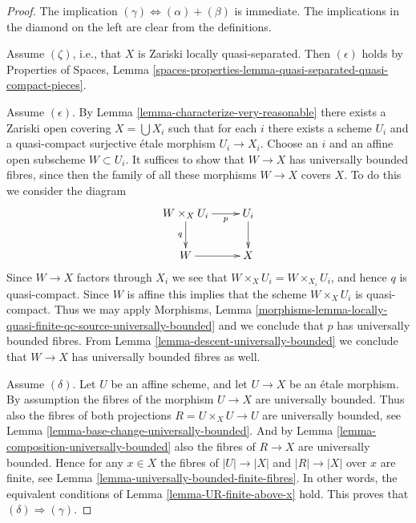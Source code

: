 \documentclass{stacks-project}
\theoremstyle{plain}
\theoremstyle{definition}
\theoremstyle{remark}
\numberwithin{equation}{subsection}
\begin{document}
\begin{proof}
The implication $(\gamma) \Leftrightarrow (\alpha) + (\beta)$ is immediate.
The implications in the diamond on the left are clear from the
definitions.

\medskip\noindent
Assume $(\zeta)$, i.e., that $X$ is Zariski locally quasi-separated.
Then $(\epsilon)$ holds by
Properties of Spaces, Lemma
\ref{spaces-properties-lemma-quasi-separated-quasi-compact-pieces}.

\medskip\noindent
Assume $(\epsilon)$. By
Lemma \ref{lemma-characterize-very-reasonable}
there exists
a Zariski open covering $X = \bigcup X_i$ such that for each $i$
there exists a scheme $U_i$ and a quasi-compact surjective \'etale morphism
$U_i \to X_i$. Choose an $i$ and an affine open subscheme $W \subset U_i$.
It suffices to show that $W \to X$ has universally bounded fibres, since then
the family of all these morphisms $W \to X$ covers $X$.
To do this we consider the diagram
$$
\xymatrix{
W \times_X U_i \ar[r]_-p \ar[d]_q & U_i \ar[d] \\
W \ar[r] & X
}
$$
Since $W \to X$ factors through $X_i$ we see that
$W \times_X U_i = W \times_{X_i} U_i$, and hence $q$ is quasi-compact.
Since $W$ is affine this implies that the scheme $W \times_X U_i$
is quasi-compact. Thus we may apply
Morphisms, Lemma
\ref{morphisms-lemma-locally-quasi-finite-qc-source-universally-bounded}
and we conclude that $p$ has universally bounded fibres. From
Lemma \ref{lemma-descent-universally-bounded}
we conclude that $W \to X$ has universally bounded fibres as well.

\medskip\noindent
Assume $(\delta)$. Let $U$ be an affine scheme, and let $U \to X$ be an \'etale
morphism. By assumption the fibres of the morphism $U \to X$ are universally
bounded. Thus also the fibres of both projections $R = U \times_X U \to U$
are universally bounded, see
Lemma \ref{lemma-base-change-universally-bounded}.
And by
Lemma \ref{lemma-composition-universally-bounded}
also the fibres of $R \to X$ are universally bounded.
Hence for any $x \in X$ the fibres of $|U| \to |X|$ and $|R| \to |X|$
over $x$ are finite, see
Lemma \ref{lemma-universally-bounded-finite-fibres}.
In other words, the equivalent conditions of
Lemma \ref{lemma-UR-finite-above-x}
hold. This proves that $(\delta) \Rightarrow (\gamma)$.
\end{proof}
\end{document}
